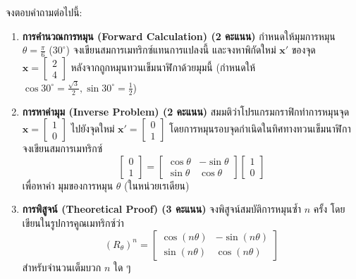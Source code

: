 \documentclass[12pt, a4paper]{exam}
\begin{document}
\begin{questions}
จงตอบคำถามต่อไปนี้:
\begin{enumerate}[label=\textbf{5.\arabic*)}]
    \item \textbf{การคำนวณการหมุน (Forward Calculation) (2 คะแนน)} กำหนดให้มุมการหมุน $\theta = \frac{\pi}{6}$ ($30^\circ$) จงเขียนสมการเมทริกซ์แทนการแปลงนี้ และจงหาพิกัดใหม่ $\mathbf{x}'$ ของจุด $\mathbf{x} = \begin{bmatrix} 2 \\ 4 \end{bmatrix}$ หลังจากถูกหมุนทวนเข็มนาฬิกาด้วยมุมนี้ (กำหนดให้ $\cos 30^\circ = \frac{\sqrt{3}}{2}, \sin 30^\circ = \frac{1}{2}$)
    \item \textbf{การหาค่ามุม (Inverse Problem) (2 คะแนน)} สมมติว่าโปรแกรมกราฟิกทำการหมุนจุด $\mathbf{x} = \begin{bmatrix} 1 \\ 0 \end{bmatrix}$ ไปยังจุดใหม่ $\mathbf{x}' = \begin{bmatrix} 0 \\ 1 \end{bmatrix}$ โดยการหมุนรอบจุดกำเนิดในทิศทางทวนเข็มนาฬิกา จงเขียนสมการเมทริกซ์
    \[ \begin{bmatrix} 0 \\ 1 \end{bmatrix} = \begin{bmatrix} \cos\theta & -\sin\theta \\ \sin\theta & \cos\theta \end{bmatrix} \begin{bmatrix} 1 \\ 0 \end{bmatrix} \]
    เพื่อหาค่า มุมของการหมุน $\theta$ (ในหน่วยเรเดียน)
    \item \textbf{การพิสูจน์ (Theoretical Proof) (3 คะแนน)} จงพิสูจน์สมบัติการหมุนซ้ำ $n$ ครั้ง โดยเขียนในรูปการคูณเมทริกซ์ว่า
    \[ (R_\theta)^n = \begin{bmatrix} \cos(n\theta) & -\sin(n\theta) \\ \sin(n\theta) & \cos(n\theta) \end{bmatrix} \]
    สำหรับจำนวนเต็มบวก $n$ ใด ๆ
\end{enumerate}

\end{questions}
\end{document}
